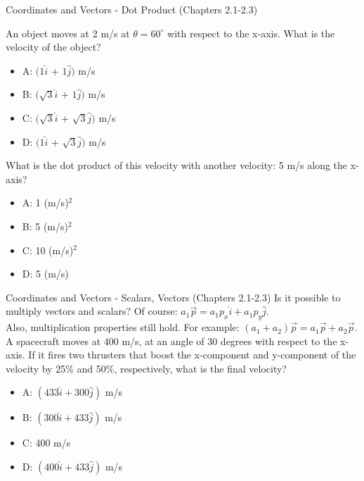 \documentclass{beamer}
\begin{document}
\begin{frame}{Coordinates and Vectors - Dot Product (Chapters 2.1-2.3)}
\small
\begin{minipage}[b]{0.45\linewidth}
An object moves at 2 m/s at $\theta = 60^{\circ}$ with respect to the x-axis.  What is the velocity of the object?
\vspace{0.2cm}
\begin{itemize}
\item A: $(1\hat{i}$ + $1\hat{j})$  m/s
\item B: $(\sqrt{3}\hat{i}$ + $1\hat{j})$  m/s
\item C: $(\sqrt{3}\hat{i}$ + $\sqrt{3}\hat{j})$  m/s
\item D: $(1\hat{i}$ + $\sqrt{3}\hat{j})$  m/s
\end{itemize}
\end{minipage}
\hspace{0.5cm}
\begin{minipage}[b]{0.45\linewidth}
What is the dot product of this velocity with another velocity: 5 m/s along the x-axis?
\vspace{0.7cm}
\begin{itemize}
\item A: 1 (m/s)$^2$
\item B: 5 (m/s)$^2$
\item C: 10 (m/s)$^2$
\item D: 5 (m/s)
\end{itemize}
\end{minipage}
\end{frame}

\begin{frame}{Coordinates and Vectors - Scalars, Vectors (Chapters 2.1-2.3)}
Is it possible to multiply vectors and scalars?  Of course: $a_1\vec{p} = a_1p_x\hat{i}+a_1p_y\hat{j}$.\\
\vspace{0.2cm}
Also, multiplication properties still hold.  For example: $(a_1+a_2)\vec{p} = a_1\vec{p}+a_2\vec{p}$. \\
\vspace{0.2cm}
\small
A spacecraft moves at 400 m/s, at an angle of 30 degrees with respect to the x-axis.  If it fires two thrusters that boost the x-component and y-component of the velocity by 25\% and 50\%, respectively, what is the final velocity?
\begin{itemize}
\item A: $(433\hat{i}+300\hat{j})$ m/s
\item B: $(300\hat{i}+433\hat{j})$ m/s
\item C: 400 m/s
\item D: $(400\hat{i}+433\hat{j})$ m/s
\end{itemize}
\end{frame}
\end{document}
